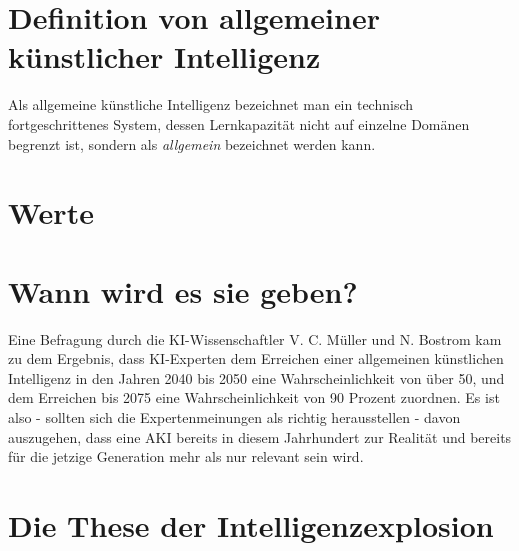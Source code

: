 \section{Definition von allgemeiner künstlicher Intelligenz}
Als allgemeine künstliche Intelligenz bezeichnet man ein technisch fortgeschrittenes System, dessen Lernkapazität nicht auf einzelne Domänen begrenzt ist, sondern als \emph{allgemein} bezeichnet werden kann. 
\section{Werte}
\section{Wann wird es sie geben?}
Eine Befragung durch die KI-Wissenschaftler V. C. Müller und N. Bostrom kam zu dem Ergebnis, dass KI-Experten dem Erreichen einer allgemeinen künstlichen Intelligenz in den Jahren 2040 bis 2050 eine Wahrscheinlichkeit von über 50, und dem Erreichen bis 2075 eine Wahrscheinlichkeit von 90 Prozent zuordnen.  Es ist also - sollten sich die Expertenmeinungen als richtig herausstellen - davon auszugehen, dass eine AKI bereits in diesem Jahrhundert zur Realität und bereits für die jetzige Generation mehr als nur relevant sein wird. 
\section{Die These der Intelligenzexplosion}
